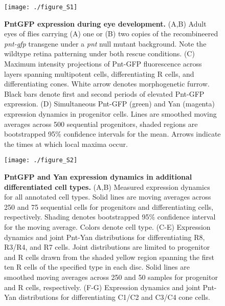 \graphicspath{ {./figures/ratio/} }



\begin{figure}[h]
\centering
\texttt{[image: ./figure\_S1]}
\caption[PntGFP expression during eye development.]{\textbf{PntGFP expression during eye development.} (A,B) Adult eyes of flies carrying (A) one or (B) two copies of the recombineered \textit{pnt-gfp} transgene under a \textit{pnt} null mutant background. Note the wildtype retina patterning under both rescue conditions. (C) Maximum intensity projections of Pnt-GFP fluorescence across layers spanning multipotent cells, differentiating R cells, and differentiating cones. White arrow denotes morphogenetic furrow. Black bars denote first and second periods of elevated Pnt-GFP expression. (D) Simultaneous Pnt-GFP (green) and Yan (magenta) expression dynamics in progenitor cells. Lines are smoothed moving averages across 500 sequential progenitors, shaded regions are bootstrapped 95\% confidence intervals for the mean. Arrows indicate the times at which local maxima occur.}
\label{fig:ratio:figS1}
\end{figure}

\begin{figure}[h]
\centering
\texttt{[image: ./figure\_S2]}
\caption[PntGFP and Yan expression dynamics in additional differentiated cell types.]{\textbf{PntGFP and Yan expression dynamics in additional differentiated cell types.} (A,B) Measured expression dynamics for all annotated cell types. Solid lines are moving averages across 250 and 75 sequential cells for progenitors and differentiating cells, respectively. Shading denotes bootstrapped 95\% confidence interval for the moving average. Colors denote cell type. (C-E) Expression dynamics and joint Pnt-Yan distributions for differentiating R8, R3/R4, and R7 cells. Joint distributions are limited to progenitor and R cells drawn from the shaded yellow region spanning the first ten R cells of the specified type in each disc. Solid lines are smoothed moving averages across 250 and 50 samples for progenitor and R cells, respectively. (F-G) Expression dynamics and joint Pnt-Yan distributions for differentiating C1/C2 and C3/C4 cone cells.}
\label{fig:ratio:figS2}
\end{figure}

